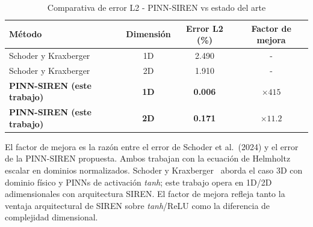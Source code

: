 \begin{table}[htbp]
\centering
\begin{threeparttable}
\caption{Comparativa de error L2 - PINN-SIREN vs estado del arte}
\label{tab:comparativa}
\begin{tabular}{lccc}
\toprule
Método & Dimensión & Error L2 (\%) & Factor de mejora \\
\midrule
Schoder y Kraxberger~\cite{Schoder2024_PINN_acoustics} & 1D & 2.490 & -        \\
Schoder y Kraxberger~\cite{Schoder2024_PINN_acoustics} & 2D & 1.910 & -        \\
\textbf{PINN-SIREN (este trabajo)} & \textbf{1D} & \textbf{0.006} & $\times 415$ \\
\textbf{PINN-SIREN (este trabajo)} & \textbf{2D} & \textbf{0.171} & $\times 11.2$   \\
\bottomrule
\end{tabular}
\begin{tablenotes}
\small
\item El factor de mejora es la razón entre el error de Schoder et al.\ (2024)
      y el error de la PINN-SIREN propuesta.
      Ambos trabajan con la ecuación de Helmholtz escalar en dominios normalizados.
      Schoder y Kraxberger~\cite{Schoder2024_PINN_acoustics} aborda el caso 3D con dominio físico y PINNs
      de activación \textit{tanh}; este trabajo opera en 1D/2D adimensionales con
      arquitectura SIREN.
      El factor de mejora refleja tanto la ventaja arquitectural de SIREN sobre
      \textit{tanh}/ReLU como la diferencia de complejidad dimensional.
\end{tablenotes}
\end{threeparttable}
\end{table}
